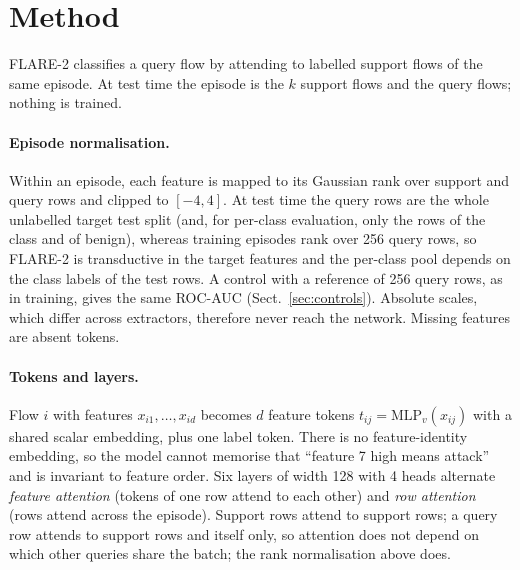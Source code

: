 \documentclass[11pt]{article}
\begin{document}
\begin{table}[t]
\centering\small
\caption{Zero-shot ROC-AUC on the target test split ($k=0$). LODO: CatBoost on all other datasets pooled. Pairwise: mean and best single source from the pairwise benchmark (not computed for CTU-13). Full label: CatBoost trained on the full target train split.}\label{tab:zero}

\end{table}

\section{Method}\label{sec:method}
FLARE-2 classifies a query flow by attending to labelled support flows of the same episode.
At test time the episode is the $k$ support flows and the query flows; nothing is trained.

\paragraph{Episode normalisation.}
Within an episode, each feature is mapped to its Gaussian rank over support and query rows and clipped to $[-4,4]$. At test time the query rows are the whole unlabelled target test split (and, for per-class evaluation, only the rows of the class and of benign), whereas training episodes rank over 256 query rows, so FLARE-2 is transductive in the target features and the per-class pool depends on the class labels of the test rows. A control with a reference of 256 query rows, as in training, gives the same ROC-AUC (Sect.~\ref{sec:controls}).
Absolute scales, which differ across extractors, therefore never reach the network.
Missing features are absent tokens.

\paragraph{Tokens and layers.}
Flow $i$ with features $x_{i1},\dots,x_{id}$ becomes $d$ feature tokens $t_{ij}=\mathrm{MLP}_v(x_{ij})$ with a shared scalar embedding, plus one label token.
There is no feature-identity embedding, so the model cannot memorise that ``feature 7 high means attack'' and is invariant to feature order.
Six layers of width 128 with 4 heads alternate \emph{feature attention} (tokens of one row attend to each other) and \emph{row attention} (rows attend across the episode).
Support rows attend to support rows; a query row attends to support rows and itself only, so attention does not depend on which other queries share the batch; the rank normalisation above does.
\end{document}
